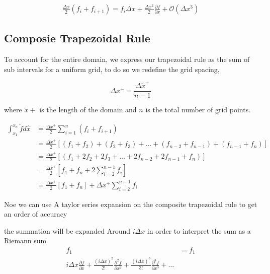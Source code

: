\documentclass[12pt]{article}
\begin{document}
\begin{align*}
    \frac{\Delta x}{2 }(f_i + f_{i+1} )= 
    f_i {\Delta x} + \frac{\Delta x ^2}{2}\frac{\partial f}{\partial x } +
\mathcal{O}\left( \Delta x^3 \right) 
\end{align*}


\subsection{Composie Trapezoidal Rule}
To account for the entire domain, we express our trapezoidal rule as the sum 
of sub intervals for a uniform grid, to do so we redefine the grid spacing,

\[\Delta x^+   = \frac{\Delta \widetilde{ x}^+  }{n - 1}   \]

where $\widetilde{x}+$ is the length of the domain
and $n$ is the total number of grid points. 

\begin{align*}
    \int_{x_1}^{x_n} \widetilde{f} d \hat{x} &= 
    \frac{\Delta x^+}{2} \sum_{i=1}^{n}
    \left( 
        f_i + f_{i+1}
    \right) \\ 
    &=
    \frac{\Delta x^+}{2}  
    \left[ 
        \left( f_1 + f_2 \right) +
        \left( f_2 + f_3 \right)  +\dots +
        \left( f_{n-2} + f_{n-1} \right) + 
        \left( f_{n-1} + f_{n} \right)  
    \right] \\
    &=
    \frac{\Delta x^+}{2}  
    \left[ 
        \left( f_1 +
            2f_2  +
         2f_3+\dots +
         2f_{n-2} + 
         2f_{n-1}  + 
         f_{n} \right)  
    \right] \\
    &=
    \frac{\Delta x^+}{2}
    \left[ 
        f_1 + f_n + 
        2 \sum_{i=2}^{n-1}
        f_i
    \right] \\
    &=
    \frac{\Delta x^+}{2}
    \left[ 
        f_1 + f_n \right] 
        + 
        \Delta x^+ \sum_{i=2}^{n-1}
    f_i
\end{align*}

Noe we can use A taylor series expansion on the composite trapezoidal rule to
get an order of accuracy

the summation will be expanded Around $ i \Delta x$ in order to interpret the sum 
as a Riemann sum
\begin{align*}
    f_1  &= f_1\\
    i\Delta x \frac{\partial f }{\partial x } +
    \frac{(i\Delta x)^2}{2!} \frac{\partial^2 f }{\partial x^2 } +
    \frac{(i\Delta x)^3}{3!} \frac{\partial^3 f }{\partial x^3 } + \dots
\end{align*}
\end{document}
